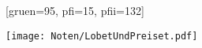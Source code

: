 [gruen={95}, pfi={15}, pfii={132}]

\centering\texttt{[image: Noten/LobetUndPreiset.pdf]}

\endsong
